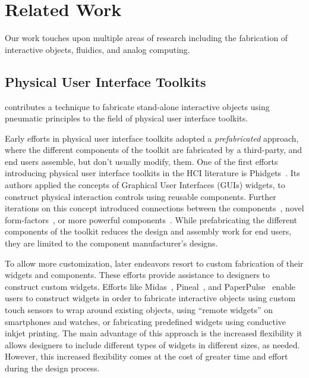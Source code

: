   \section{Related Work}
    Our work touches upon multiple areas of research including the
    fabrication of interactive objects, fluidics, and analog computing.

      \subsection{Physical User Interface Toolkits}
        \al contributes a technique to fabricate stand-alone interactive
        objects using pneumatic principles to the field of physical user
        interface toolkits.

        Early efforts in physical user interface toolkits adopted a
        \emph{prefabricated} approach, where the different components of
        the toolkit are fabricated by a third-party, and end users
        assemble, but don't usually modify, them. One of the first efforts
        introducing physical user interface toolkits in the HCI literature
        is Phidgets~\cite{Greenberg:2001}. Its authors applied the concepts
        of Graphical User Interfaces (GUIs) widgets, to construct physical
        interaction controls using reusable components. Further iterations
        on this concept introduced connections between the
        components~\cite{Bdeir:2009}, novel
        form-factors~\cite{Hodges:2014}, or more powerful
        components~\cite{Villar:2012}. While prefabricating the different
        components of the toolkit reduces the design and assembly work for
        end users, they are limited to the component manufacturer's
        designs.
        
        To allow more customization, later endeavors resort to custom
        fabrication of their widgets and components. These efforts provide
        assistance to designers to construct custom widgets. Efforts like
        Midas~\cite{Savage:2012}, Pineal~\cite{Ledo:2017}, and
        PaperPulse~\cite{Ramakers:2015} enable users to construct widgets
        in order to fabricate interactive objects using custom touch
        sensors to wrap around existing objects, using ``remote widgets''
        on smartphones and watches, or fabricating predefined widgets using
        conductive inkjet printing. The main advantage of this approach is
        the increased flexibility it allows designers to
        include different types of widgets in different sizes,
        as needed. However, this increased flexibility comes at the cost of
        greater time and effort during the design process.

